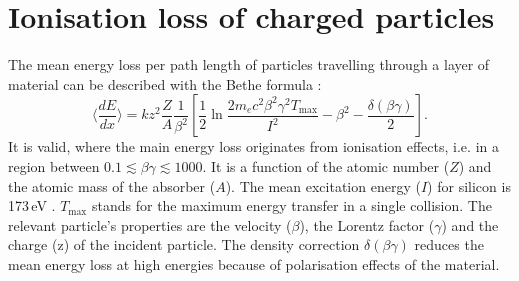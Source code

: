 \section{Ionisation loss of charged particles}
\label{sec:sub:MeasuringDeDx}
The mean energy loss per path length of particles travelling through a layer of material can be described with the Bethe formula \cite{bib:Bethe_1930}:
\begin{equation*}
\langle \frac{dE}{dx} \rangle = kz^2\frac{Z}{A}\frac{1}{\beta^2} [ \frac{1}{2} \ln{\frac{2m_e c^2 \beta^2 \gamma^2 T_{\text{max}}}{I^2}} - \beta^2 - \frac{\delta( \beta \gamma )}{2} ].
\end{equation*}
It is valid, where the main energy loss originates from ionisation effects, i.e. in a region between $0.1\lesssim\beta\gamma\lesssim 1000$.
It is a function of the atomic number ($Z$) and the atomic mass of the absorber ($A$). 
The mean excitation energy ($I$) for silicon is 173\,eV \cite{bib:NIST}. 
$T_{\text{max}}$ stands for the maximum energy transfer in a single collision.
The relevant particle's properties are the velocity ($\beta$), the Lorentz factor ($\gamma$) and the charge (z) of the incident particle.
The density correction $\delta( \beta \gamma )$ reduces the mean energy loss at high energies because of polarisation effects of the material.

